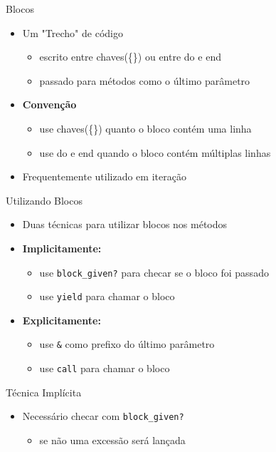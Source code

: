 
\begin{frame}{Blocos}
  \begin{itemize}
    \item Um "Trecho" de código
    \begin{itemize}
      \item escrito entre chaves(\{\}) ou entre \alert{do} e \alert{end}
      \item passado para métodos como o \alert{último} parâmetro
    \end{itemize}
    \item \textbf{Convenção} 
    \begin{itemize}
      \item use chaves(\{\}) quanto o bloco contém uma linha
      \item use \alert{do} e \alert{end} quando o bloco contém múltiplas linhas
    \end{itemize}
    \item Frequentemente utilizado em \alert{iteração}
  \end{itemize}
  
  
    
\end{frame}

\begin{frame}[fragile,t]{Utilizando Blocos}
  \begin{itemize}
    \item Duas técnicas para utilizar blocos nos métodos
    \item \textbf{Implicitamente:}
    \begin{itemize}
      \item use \verb!block_given?! para checar se o bloco foi passado
      \item use \verb!yield! para \alert{chamar} o bloco
    \end{itemize}
    \item \textbf{Explicitamente:}
    \begin{itemize}
      \item use \verb!&! como prefixo do último parâmetro
      \item use \verb!call! para \alert{chamar} o bloco
    \end{itemize} 
  \end{itemize}   
\end{frame}

\begin{frame}[fragile,t]{Técnica Implícita}
  \begin{itemize}
    \item Necessário checar com \verb!block_given?! 
    \begin{itemize}
    	\item se não uma excessão será lançada
    \end{itemize}
    
	
  \end{itemize}   
\end{frame}

